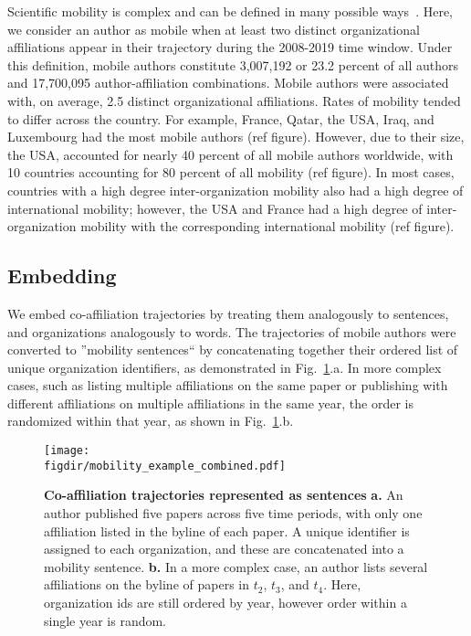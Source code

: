 \documentclass[12pt]{article} %
\def\figdir{../Figs}
\begin{document}
Scientific mobility is complex and can be defined in many possible ways~\cite{robinson2019mobility}.
Here, we consider an author as mobile when at least two distinct organizational affiliations appear in their trajectory during the 2008-2019 time window. 
Under this definition, mobile authors constitute 3,007,192 or 23.2 percent of all authors and 17,700,095 author-affiliation combinations. 
Mobile authors were associated with, on average, 2.5 distinct organizational affiliations. 
Rates of mobility tended to differ across the country. 
For example, France, Qatar, the USA, Iraq, and Luxembourg had the most mobile authors (ref figure).
However, due to their size, the USA, accounted for nearly 40 percent of all mobile authors worldwide, with  10 countries accounting for 80 percent of all mobility (ref figure).
In most cases, countries with a high degree inter-organization mobility also had a high degree of international mobility;
however, the USA and France had a high degree of inter-organization mobility with the corresponding international mobility (ref figure). 


\subsection*{Embedding}
We embed co-affiliation trajectories by treating them analogously to sentences, and organizations analogously to words. 
The trajectories of mobile authors were converted to ''mobility sentences`` by concatenating together their ordered list of unique organization identifiers, as demonstrated in Fig.~\ref{fig:methods:mobility_sentence}.a.
In more complex cases, such as listing multiple affiliations on the same paper or publishing with different affiliations on multiple affiliations in the same year, the order is randomized within that year, as shown in  Fig.~\ref{fig:methods:mobility_sentence}.b. 

%
%
\begin{figure}[ht!]
    \centering
    \label{fig:methods:mobility_sentence}
    \texttt{[image: \\figdir/mobility\_example\_combined.pdf]}
    \caption{
        \textbf{Co-affiliation trajectories represented as sentences}
        \textbf{a.} 
        An author published five papers across five time periods, with only one affiliation listed in the byline of each paper. 
        A unique identifier is assigned to each organization, and these are concatenated into a mobility sentence. 
        \textbf{b.}
        In a more complex case, an author lists several affiliations on the byline of papers in $t_{2}$, $t_{3}$, and $t_{4}$. Here, organization ids are still ordered by year, however order within a single year is random.      
    }
\end{figure}
\end{document}
